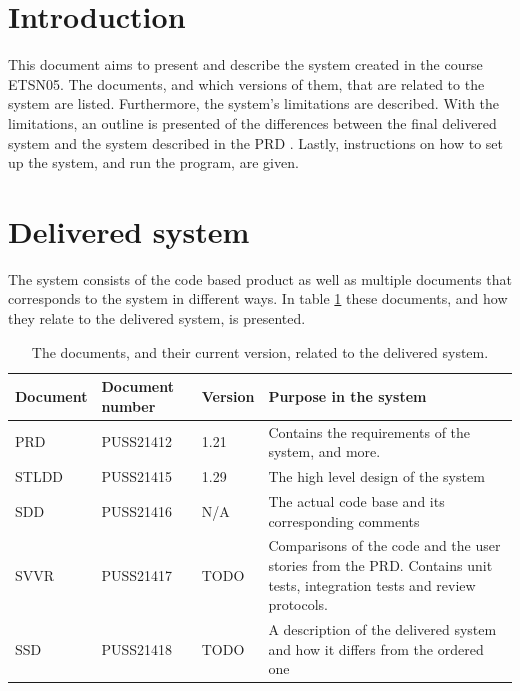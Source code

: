 \documentclass{article}
\begin{document}
\section{Introduction}\label{sec:intro} %
This document aims to present and describe the system created in the course ETSN05. The documents, and which versions of them, that are related to the system are listed. Furthermore, the system's limitations are described. With the limitations, an outline is presented of the differences between the final delivered system and the system described in the PRD \cite{PRD}. Lastly, instructions on how to set up the system, and run the program, are given. 

\section{Delivered system} %


The system consists of the code based product as well as multiple documents that corresponds to the system in different ways. In table \ref{tab:deliveredSys} these documents, and how they relate to the delivered system, is presented. 

\begin{table}[h]
    \centering
    \begin{tabular}{|l|l|l|p{90mm}|}
    \hline
    Document & Document number & Version & Purpose in the system \\
    \hline \hline
    PRD & PUSS21412 & 1.21 & Contains the requirements of the system, and more. \\ \hline
    STLDD & PUSS21415 & 1.29 & The high level design of the system \\ \hline 
    SDD & PUSS21416 & N/A & The actual code base and its corresponding comments \\ \hline
    SVVR & PUSS21417 & TODO & Comparisons of the code and the user stories from the PRD. Contains unit tests, integration tests and review protocols. \\ \hline
    SSD & PUSS21418 & TODO & A description of the delivered system and how it differs from the ordered one \\ \hline
    \end{tabular}
    \caption{The documents, and their current version, related to the delivered system.}
    \label{tab:deliveredSys}
\end{table}
\end{document}
